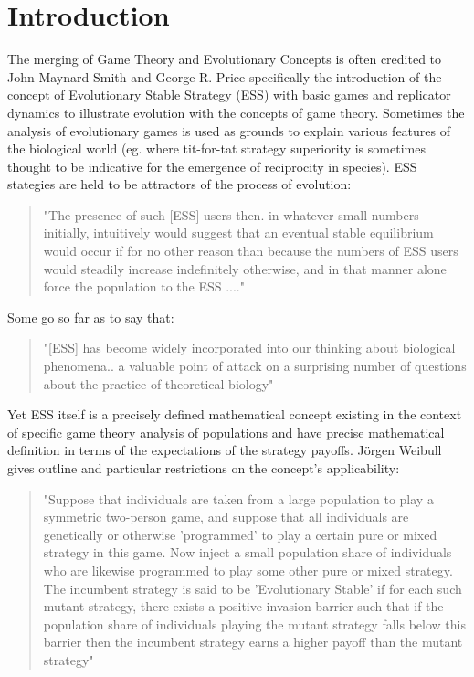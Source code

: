 \documentclass[journal,article,accept,oneauthors,pdftex,10pt,a4paper]{mdpi}
\begin{document}
\section{Introduction}

The merging of Game Theory and Evolutionary Concepts is often credited to John Maynard Smith and George R. Price \cite{maynard}\cite{maynard2} specifically the introduction of the concept of Evolutionary Stable Strategy (ESS) with basic games and replicator dynamics to illustrate evolution with the concepts of game theory.
Sometimes the analysis of evolutionary games is used as grounds to explain various features of the biological world (eg. where tit-for-tat strategy superiority is sometimes thought to be indicative for the emergence of reciprocity in species\cite{titfortat}).
ESS stategies are held to be attractors of the process of evolution:
\begin{quote}"The presence of such [ESS] users then. in whatever small numbers initially, intuitively would suggest that an eventual stable equilibrium would occur if for no other reason than because the numbers of ESS users would steadily increase indefinitely otherwise, and in that manner alone force the population to the ESS ...."\cite{ess1}\end{quote}
Some go so far as to say that:
\begin{quote}"[ESS] has become widely incorporated into our thinking about biological phenomena.. a valuable point of attack on a surprising number of questions about the practice of theoretical biology"\cite{ess1}\end{quote}
Yet ESS itself is a precisely defined mathematical concept existing in the context of specific game theory analysis of populations and have precise mathematical definition in terms of the expectations of the strategy payoffs.
J\"orgen Weibull gives outline and particular restrictions on the concept's applicability: 
\begin{quote}"Suppose that individuals are taken from a large population to play a symmetric two-person game, and suppose that all individuals are genetically or otherwise 'programmed' to play a certain pure or mixed strategy in this game. Now inject a small population share of individuals who are likewise programmed to play some other pure or mixed strategy. The incumbent strategy is said to be 'Evolutionary Stable' if for each such mutant strategy, there exists a positive invasion barrier such that if the population share of individuals playing the mutant strategy falls below this barrier then the incumbent strategy earns a higher payoff than the mutant strategy"\cite{weibull}\end{quote}
\end{document}
